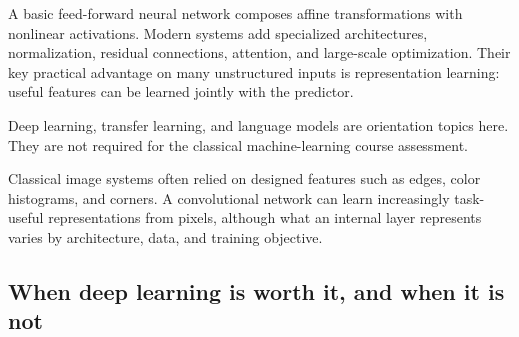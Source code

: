A basic feed-forward neural network composes affine transformations with nonlinear activations. Modern systems add specialized architectures, normalization, residual connections, attention, and large-scale optimization. Their key practical advantage on many unstructured inputs is representation learning: useful features can be learned jointly with the predictor.

\begin{optionaltopic}
Deep learning, transfer learning, and language models are orientation topics here. They are not required for the classical machine-learning course assessment.
\end{optionaltopic}

\begin{mlfigure}
\end{mlfigure}

\begin{analogy}
Classical image systems often relied on designed features such as edges, color histograms, and corners. A convolutional network can learn increasingly task-useful representations from pixels, although what an internal layer represents varies by architecture, data, and training objective.
\end{analogy}

\subsection{When deep learning is worth it, and when it is not}

